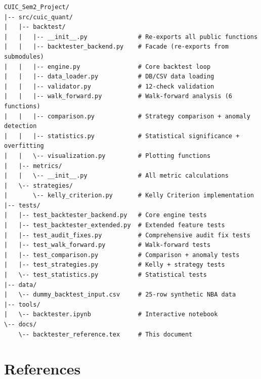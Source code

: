 \documentclass[12pt,a4paper]{report}
\theoremstyle{definition}
\begin{document}
\begin{lstlisting}[language={}, basicstyle=\ttfamily\small]
CUIC_Sem2_Project/
|-- src/cuic_quant/
|   |-- backtest/
|   |   |-- __init__.py              # Re-exports all public functions
|   |   |-- backtester_backend.py    # Facade (re-exports from submodules)
|   |   |-- engine.py                # Core backtest loop
|   |   |-- data_loader.py           # DB/CSV data loading
|   |   |-- validator.py             # 12-check validation
|   |   |-- walk_forward.py          # Walk-forward analysis (6 functions)
|   |   |-- comparison.py            # Strategy comparison + anomaly detection
|   |   |-- statistics.py            # Statistical significance + overfitting
|   |   \-- visualization.py         # Plotting functions
|   |-- metrics/
|   |   \-- __init__.py              # All metric calculations
|   \-- strategies/
|       \-- kelly_criterion.py       # Kelly Criterion implementation
|-- tests/
|   |-- test_backtester_backend.py   # Core engine tests
|   |-- test_backtester_extended.py  # Extended feature tests
|   |-- test_audit_fixes.py          # Comprehensive audit fix tests
|   |-- test_walk_forward.py         # Walk-forward tests
|   |-- test_comparison.py           # Comparison + anomaly tests
|   |-- test_strategies.py           # Kelly + strategy tests
|   \-- test_statistics.py           # Statistical tests
|-- data/
|   \-- dummy_backtest_input.csv     # 25-row synthetic NBA data
|-- tools/
|   \-- backtester.ipynb             # Interactive notebook
\-- docs/
    \-- backtester_reference.tex     # This document
\end{lstlisting}



\chapter*{References}
\end{document}
